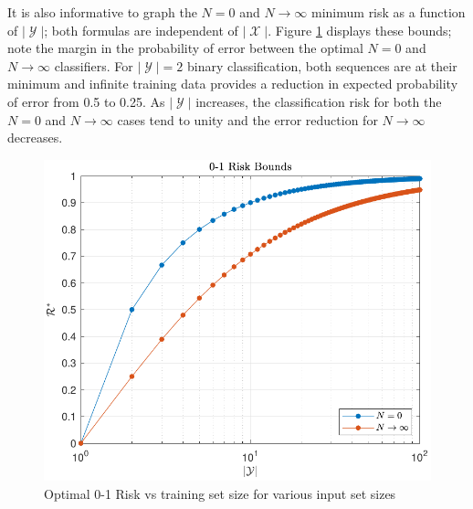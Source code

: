 \documentclass[conference]{IEEEtran}
\DeclareMathOperator{\Xcal}{\mathcal{X}}
\DeclareMathOperator{\Ycal}{\mathcal{Y}}
\begin{document}
%


It is also informative to graph the $N=0$ and $N \to \infty$ minimum risk as a function of $|\Ycal|$; both formulas are independent of $|\Xcal|$. Figure \ref{fig:Risk_01_uni_N_bounds} displays these bounds; note the margin in the probability of error between the optimal $N=0$ and $N \to \infty$ classifiers. For $|\Ycal| = 2$ binary classification, both sequences are at their minimum and infinite training data provides a reduction in expected probability of error from 0.5 to 0.25. As $|\Ycal|$ increases, the classification risk for both the $N=0$ and $N \to \infty$ cases tend to unity and the error reduction for $N \to \infty$ decreases. 

\begin{figure}
\centering
\includegraphics[width=1.0\linewidth]{Risk_01_uni_N_bounds.pdf}
\caption{Optimal 0-1 Risk vs training set size for various input set sizes}
\label{fig:Risk_01_uni_N_bounds}
\end{figure}
\end{document}
